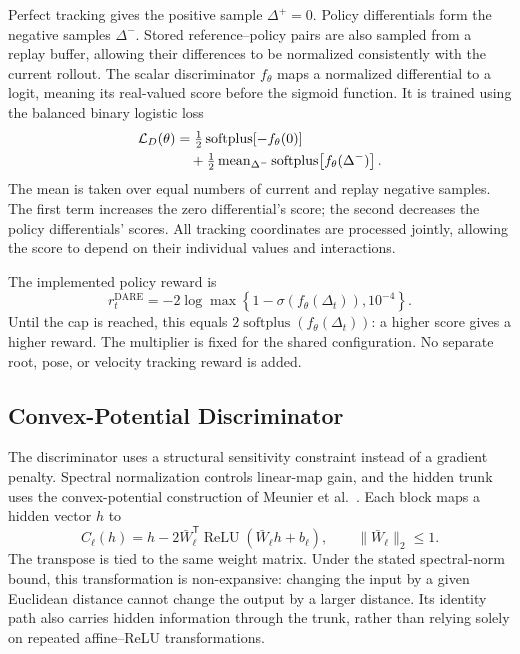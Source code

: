 \documentclass[letterpaper,10pt,conference]{ieeeconf}
\begin{document}
Perfect tracking gives the positive sample $\Delta^+=0$. Policy
differentials form the negative samples $\Delta^-$. Stored reference--policy
pairs are also sampled from a replay buffer, allowing their differences
to be normalized consistently with the current rollout. The scalar
discriminator $f_\theta$ maps a normalized differential to a logit,
meaning its real-valued score before the sigmoid function. It is trained
using the balanced binary logistic loss
\begin{align}
\mathcal L_D(\theta)
&=\tfrac12\operatorname{softplus}\!\left[-f_\theta(0)\right]
\notag\\
&\quad+\tfrac12\operatorname{mean}_{\Delta^-}
\operatorname{softplus}\!\left[f_\theta(\Delta^-)\right].
\label{eq:disc}
\end{align}
The mean is taken over equal numbers of current and replay negative
samples. The first term increases the zero differential's score; the
second decreases the policy differentials' scores. All tracking
coordinates are processed jointly, allowing the score to depend on their
individual values and interactions.

The implemented policy reward is
\begin{equation}
r_t^{\mathrm{DARE}}=-2\log\max\!\left\{
1-\sigma\!\left(f_\theta(\Delta_t)\right),10^{-4}\right\}.
\label{eq:reward}
\end{equation}
Until the cap is reached, this equals
$2\operatorname{softplus}(f_\theta(\Delta_t))$: a higher score gives a
higher reward. The multiplier is fixed for the shared configuration. No
separate root, pose, or velocity tracking reward is added.

\subsection{Convex-Potential Discriminator}
The discriminator uses a structural sensitivity constraint instead of a
gradient penalty. Spectral normalization controls linear-map gain, and
the hidden trunk uses the convex-potential construction of Meunier
et al.\ \cite{meunier2022cpl}. Each block maps a hidden vector $h$ to
\begin{equation}
C_\ell(h)=h-2\bar W_\ell^{\mathsf T}
\operatorname{ReLU}(\bar W_\ell h+b_\ell),
\qquad \|\bar W_\ell\|_2\leq1.
\label{eq:cpl}
\end{equation}
The transpose is tied to the same weight matrix. Under the stated
spectral-norm bound, this transformation is non-expansive: changing the
input by a given Euclidean distance cannot change the output by a larger
distance. Its identity path also carries hidden information through the
trunk, rather than relying solely on repeated affine--ReLU transformations.
\end{document}
